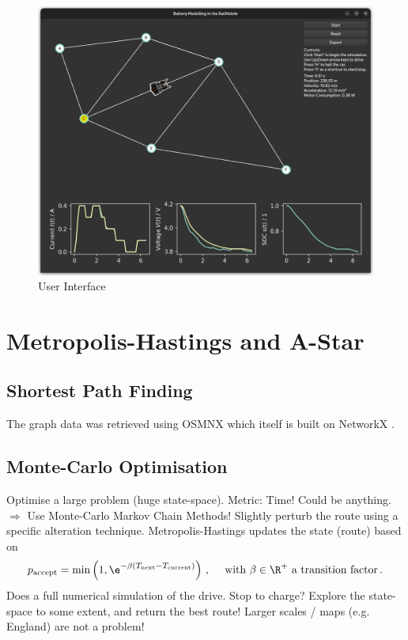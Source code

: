 \documentclass{prettytex/ox/mmsc-special-topic}
\begin{document}
  \begin{figure}[H]
    \centering
    \includegraphics[width=\linewidth]{figures/screenshot.png}
    \caption{User Interface}
  \end{figure}

  \section{Metropolis-Hastings and A-Star}
  \subsection{Shortest Path Finding}
  The graph data was retrieved using OSMNX \parencite{osmnx} which itself is built on NetworkX \parencite{networkx}.

  \subsection{Monte-Carlo Optimisation}
  Optimise a large problem (huge state-space). Metric: Time! Could be anything.
  $\Rightarrow$ Use Monte-Carlo Markov Chain Methods!
  Slightly perturb the route using a specific alteration technique.
  Metropolis-Hastings updates the state (route) based on $$p_{\rm accept} = \min\left(1, \e^{-\beta (T_{\rm next} - T_{\rm current})}\right)\,, \quad \text{ with } \beta \in \R^+ \text{ a transition factor} \,.$$
  Does a full numerical simulation of the drive. Stop to charge?
  Explore the state-space to some extent, and return the best route!
  Larger scales / maps (e.g. England) are not a problem!
\end{document}
